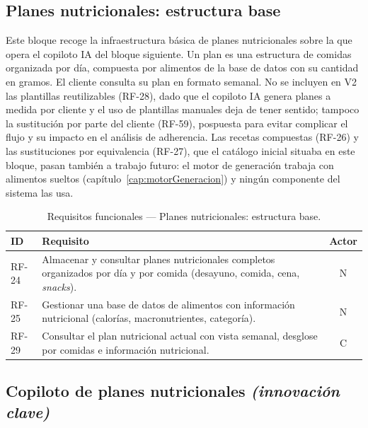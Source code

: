 \subsection{Planes nutricionales: estructura base}

Este bloque recoge la infraestructura básica de planes nutricionales sobre la que opera el copiloto IA del bloque siguiente. Un plan es una estructura de comidas organizada por día, compuesta por alimentos de la base de datos con su cantidad en gramos. El cliente consulta su plan en formato semanal. No se incluyen en V2 las plantillas reutilizables (RF-28), dado que el copiloto IA genera planes a medida por cliente y el uso de plantillas manuales deja de tener sentido; tampoco la sustitución por parte del cliente (RF-59), pospuesta para evitar complicar el flujo y su impacto en el análisis de adherencia. Las recetas compuestas (RF-26) y las sustituciones por equivalencia (RF-27), que el catálogo inicial situaba en este bloque, pasan también a trabajo futuro: el motor de generación trabaja con alimentos sueltos (capítulo~\ref{cap:motorGeneracion}) y ningún componente del sistema las usa.

\begin{table}[htbp]
\centering
\small
\begin{tabular}{|l|p{10.5cm}|c|}
\hline
\textbf{ID} & \textbf{Requisito} & \textbf{Actor} \\
\hline
RF-24 & Almacenar y consultar planes nutricionales completos organizados por día y por comida (desayuno, comida, cena, \textit{snacks}). & N \\
\hline
RF-25 & Gestionar una base de datos de alimentos con información nutricional (calorías, macronutrientes, categoría). & N \\
\hline
RF-29 & Consultar el plan nutricional actual con vista semanal, desglose por comidas e información nutricional. & C \\
\hline
\end{tabular}
\caption{Requisitos funcionales --- Planes nutricionales: estructura base.}
\label{tab:rf-planes-base}
\end{table}

\subsection{Copiloto de planes nutricionales \textnormal{\textit{(innovación clave)}}}
\label{subsec:rf-copiloto}

